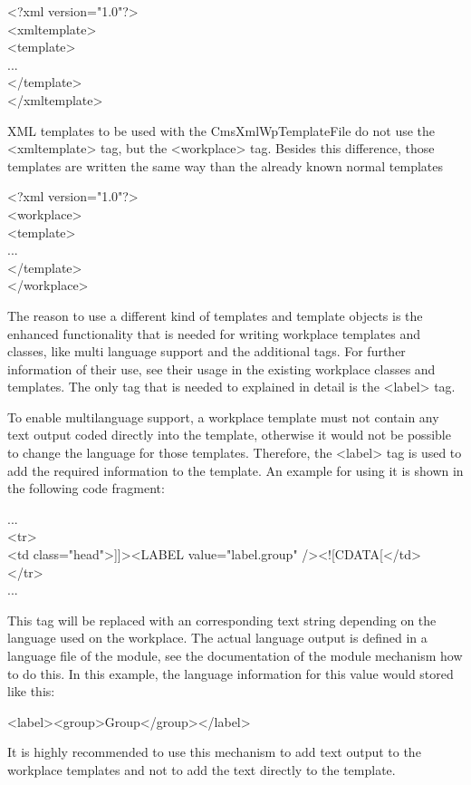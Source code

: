 \begin{xml}
<?xml version="1.0"?>\\
<xmltemplate>\\
\xtaba  <template>\\
\xtaba   ...\\
\xtaba  </template>\\
</xmltemplate>\\
\end{xml}

XML templates to be used with the {\name CmsXmlWpTemplateFile} do not use the
{\tag <xmltemplate>} tag, but the {\tag <workplace>} tag. Besides this difference,
those templates are written the same way than the already known normal
templates

\begin{xml}
<?xml version="1.0"?>\\
<workplace>\\
\xtaba  <template>\\
...\\
\xtaba  </template>\\
</workplace>\\
\end{xml}

The reason to use a different kind of templates and template objects is
the enhanced functionality that is needed for writing workplace
templates and classes, like multi language support and the additional
tags. For further information of their use, see their usage in the
existing workplace classes and templates. The only tag that is needed
to explained in detail is the <label> tag.

To enable multilanguage support, a workplace template must not contain
any text output coded directly into the template, otherwise it would not
be possible  to change the language for those templates. Therefore, the
{\tag <label>} tag is used to add the required information to the template. An
example for using it is shown in the following code fragment:

\begin{java}
...\\
<tr>\\
<td class="head">]]><LABEL value="label.group" /><![CDATA[</td>\\
</tr>\\
...\\
\end{java}

This tag will be replaced with an corresponding text string depending on
the language used on the workplace. The actual language output is
defined in a language file of the module, see the documentation of the
module mechanism how to do this. In this example, the language
information for this value would stored like this:
\begin{java}
<label><group>Group</group></label>\\
\end{java}
It is highly recommended to use this mechanism to add text output to the
workplace templates and not to add the text directly to the template.

